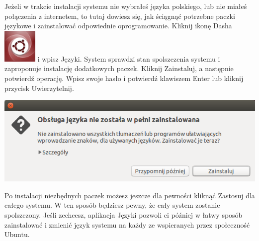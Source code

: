 Jeżeli w trakcie instalacji systemu nie wybrałeś języka polskiego, lub nie miałeś połączenia z internetem, to tutaj dowiesz się, jak ściągnąć potrzebne paczki językowe i zainstalować odpowiednie oprogramowanie.
Kliknij ikonę Dasha \includegraphics[scale=0.35]{images/ikony_dash.png} i wpisz \textcolor{ubuntu_orange}{Języki}. System sprawdzi stan spolszczenia systemu i zaproponuje instalację dodatkowych paczek. Kliknij \textcolor{ubuntu_orange}{Zainstaluj}, a następnie potwierdź operację. Wpisz swoje hasło i potwierdź klawiszem Enter lub kliknij przycisk \textcolor{ubuntu_orange}{Uwierzytelnij}.

\begin{center}
	\vspace{-10pt}
	\includegraphics{images/pierwsze_uruchomienie_lang2.png}
\end{center}

Po instalacji niezbędnych paczek możesz jeszcze dla pewności kliknąć \textcolor{ubuntu_orange}{Zastosuj dla całego systemu}. W ten sposób będziesz pewny, że cały system zostanie spolszczony.
Jeśli zechcesz, aplikacja \textcolor{ubuntu_orange}{Języki} pozwoli ci później w łatwy sposób zainstalować i zmienić język systemu na każdy ze wspieranych przez społeczność Ubuntu.

